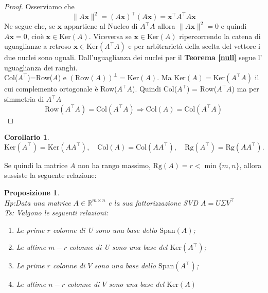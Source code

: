 \documentclass[11pt]{article}
\newtheorem{proposition}{Proposizione}
\newtheorem{corollary}{Corollario}
\newcommand{\R}{\mathbb{R}}
\begin{document}
\begin{proof}
Osserviamo che
$$\|A\mathbf{x}\|^2=(A\mathbf{x})^\top      (A\mathbf{x})=\mathbf{x}^\top      A^\top      A\mathbf{x}$$
Ne segue che, se $\mathbf{x}$ appartiene al Nucleo di $A^\top      A$ allora $\|A\mathbf{x}\|^2=0$ e quindi $A\mathbf{x}=0$, cioè $\mathbf{x} \in \text{Ker}(A)$. Viceversa se $ \mathbf{x} \in \text{Ker}(A)$ ripercorrendo la catena di uguaglianze a retroso $\mathbf{x} \in \text{Ker}(A^\top      A)$ e per arbitrarietà della scelta del vettore i due nuclei sono uguali. Dall'uguaglianza dei nuclei per il \textbf{Teorema \ref{null}} segue l' uguaglianza dei ranghi. \\
Col($A^\top      $)=Row($A$) e $(\text{Row}(A))^\perp = \text{Ker}(A)$. Ma $\text{Ker}(A)=\text{Ker}(A^\top      A)$ il cui complemento ortogonale è Row($A^\top      A$). Quindi Col($A^\top      $) = Row($A^\top      A$) ma per simmetria di $A^\top      A$ 
\[
\text{Row}(A^\top      A)=\text{Col}(A^\top      A) \Rightarrow \text{Col}(A)=\text{Col}(A^\top      A)
\] 
\end{proof}
\begin{corollary}\label{cor:A}
\[
\text{Ker}(A^\top      ) = \text{Ker}(AA^\top      ), \quad \text{Col}(A) = \text{Col}(AA^\top      ), \quad \text{Rg}(A^\top      ) = \text{Rg}(AA^\top      ).
\]
\end{corollary}
\noindent
Se quindi la matrice $A$ non ha rango massimo, $\text{Rg}(A)= r < \min{\{m,n\}}$, allora sussiste la seguente relazione:
\begin{proposition}\label{prop: span}
\textbf{}\\
\textit{Hp:}Data una matrice $A \in \R^{m \times n}$ e la sua fattorizzazione SVD $A=U\Sigma V^\top      $\\
\textit{Ts:} Valgono le seguenti relazioni:
\begin{enumerate}
	\item Le prime $r$ colonne di U sono una base dello $\text{Span}(A)$;
	\item Le ultime $m-r$ colonne di U sono una base del $\text{Ker}(A^\top      )$;
	\item Le prime $r$ colonne di $V$ sono una base dello $\text{Span}(A^\top      )$;
	\item Le ultime $n-r$ colonne di $V$ sono una base del $\text{Ker}(A)$
\end{enumerate} 
\end{proposition}
\end{document}
